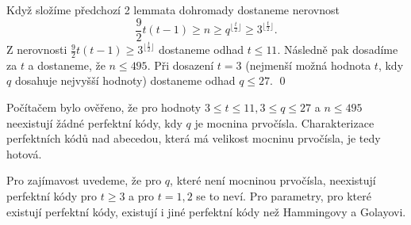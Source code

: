 \dk Když složíme předchozí 2 lemmata dohromady dostaneme nerovnost
\[
\frac{9}{2}t(t-1) \geq n \geq q^{\lfloor\frac{t}{2}\rfloor} \geq 3^{\lfloor\frac{t}{2}\rfloor}.
\]
Z nerovnosti $\frac{9}{2}t(t-1) \geq 3^{\lfloor\frac{t}{2}\rfloor}$ dostaneme odhad $t \leq 11$. Následně pak dosadíme za $t$ a dostaneme, že $n \leq 495$. Při dosazení $t=3$ (nejmenší možná hodnota $t$, kdy $q$ dosahuje nejvyšší hodnoty) dostaneme odhad $q \leq 27$. \qed

Počítačem bylo ověřeno, že pro hodnoty $3 \leq t \leq 11, 3 \leq q \leq 27$ a $n \leq 495$ neexistují žádné perfektní kódy, kdy $q$ je mocnina prvočísla. Charakterizace perfektních kódů nad abecedou, která má velikost mocninu prvočísla, je tedy hotová.

Pro zajímavost uvedeme, že pro $q$, které není mocninou prvočísla, neexistují perfektní kódy pro $t \geq 3$ a pro $t = 1,2$ se to neví. Pro parametry, pro které existují perfektní kódy, existují i jiné perfektní kódy než Hammingovy a Golayovi.